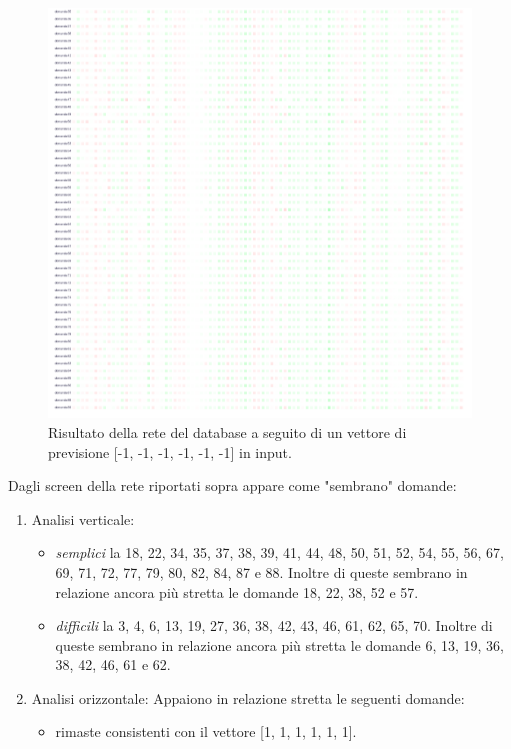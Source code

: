 \begin{itemize}
\begin{figure}[H]
\centering
	\includegraphics[width=0.90\linewidth]{./image/rete_db-vpmeno1_2.png}
	\caption{Risultato della rete del database a seguito di un vettore di previsione [-1, -1, -1, -1, -1, -1] in input.}
\end{figure}
\noindent
Dagli screen della rete riportati sopra appare come "sembrano" domande:
\begin{enumerate}
\item Analisi verticale:
\begin{itemize}
\item \textit{semplici} la 18, 22, 34, 35, 37, 38, 39, 41, 44, 48, 50, 51, 52, 54, 55, 56, 67, 69,  71, 72, 77, 79, 80, 82, 84, 87 e 88. Inoltre di queste sembrano in relazione ancora pi\`u stretta le domande 18, 22, 38, 52 e 57.
\item \textit{difficili} la 3, 4, 6, 13, 19, 27, 36, 38, 42, 43, 46, 61, 62, 65, 70. Inoltre di queste sembrano in relazione ancora pi\`u stretta le domande 6, 13, 19, 36, 38, 42, 46, 61 e 62.
\end{itemize}
\item Analisi orizzontale:
Appaiono in relazione stretta le seguenti domande:
\begin{itemize}
\item rimaste consistenti con il vettore [1, 1, 1, 1, 1, 1].
\end{itemize}
\end{enumerate}



\end{itemize}
